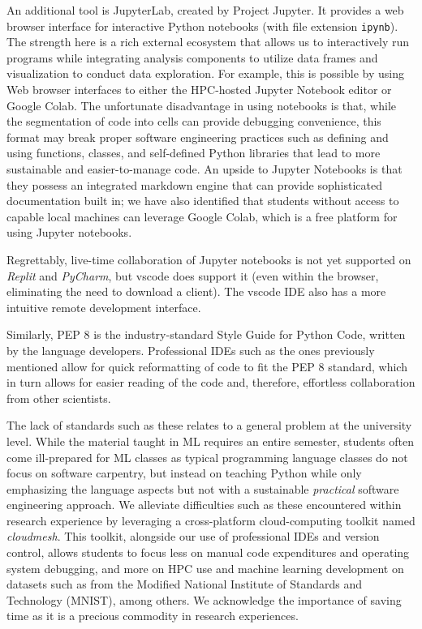 \documentclass[utf8]{FrontiersinVancouver} %
\begin{document}
An additional tool is JupyterLab, created by Project Jupyter. It provides a web browser interface for interactive Python notebooks (with file extension \verb|ipynb|). The strength here is a rich external ecosystem that allows us to interactively run programs while integrating analysis components to utilize data frames and visualization to conduct data exploration. For example, this is possible by using Web browser interfaces to either the HPC-hosted Jupyter Notebook editor or Google Colab. The unfortunate disadvantage in using notebooks is that, while the segmentation of code into cells can provide debugging convenience, this format may break proper software engineering practices such as defining and using functions, classes, and self-defined Python libraries that lead to more sustainable and easier-to-manage code. An upside to Jupyter Notebooks is that they possess an integrated markdown engine that can provide sophisticated documentation built in; we have also identified that students without access to capable local machines can leverage Google Colab, which is a free platform for using Jupyter notebooks.

Regrettably, live-time collaboration of Jupyter notebooks is not yet supported on {\em Replit} and {\em PyCharm}, but vscode does support it (even within the browser, eliminating the need to download a client). The vscode IDE also has a more intuitive remote development interface.

Similarly, PEP 8 is the industry-standard Style Guide for Python Code, written by the language developers. Professional IDEs such as the ones previously mentioned allow for quick reformatting of code to fit the PEP 8 standard, which in turn allows for easier reading of the code and, therefore, effortless collaboration from other scientists.

The lack of standards such as these relates to a general problem at the university level. While the material taught in ML requires an entire semester, students often come ill-prepared for ML classes as typical programming language classes do not focus on software carpentry, but instead on teaching Python while only emphasizing the language aspects but not with a sustainable {\em practical} software engineering approach. We alleviate difficulties such as these encountered within research experience by leveraging a cross-platform cloud-computing toolkit named {\em cloudmesh}. This toolkit, alongside our use of professional IDEs and version control, allows students to focus less on manual code expenditures and operating system debugging, and more on HPC use and machine learning development on datasets such as from the Modified National Institute of Standards and Technology (MNIST), among others. We acknowledge the importance of saving time as it is a precious commodity in research experiences.
\end{document}
